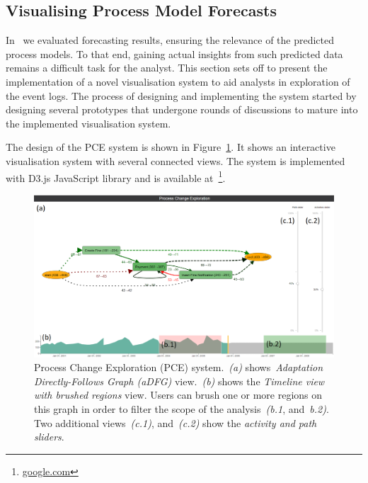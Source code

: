 \subsection{Visualising Process Model Forecasts}\label{sec:visualisation}

In~ we evaluated forecasting results, ensuring the relevance of the predicted process models. To that end, gaining actual insights from such predicted data remains a difficult task for the analyst. This section sets off to present the implementation of a novel visualisation system to aid analysts in exploration of the event logs. The process of designing and implementing the system started by designing several prototypes that undergone rounds of discussions to mature into the implemented visualisation system. 

The design of the PCE system is shown in Figure~\ref{fig:vis-two-brushes}. It shows an interactive visualisation system with several connected views. The system is implemented with D3.js JavaScript library and is available at~\footnote{\url{google.com}}.


\begin{figure}
	\centering
	\includegraphics[width=\textwidth]{img/vis/actual-predicted-two-brushed-regions-system.PNG}
	\caption{Process Change Exploration (PCE) system.~\emph{(a)} shows~\emph{Adaptation Directly-Follows Graph (aDFG)} view.~\emph{(b)} shows the \emph{Timeline view with brushed regions} view. Users can brush one or more regions on this graph in order to filter the scope of the analysis~\emph{(b.1}, and~\emph{b.2)}. Two additional views~\emph{(c.1)}, and~\emph{(c.2)} show the \emph{activity and path sliders}.} 
	\label{fig:vis-two-brushes}
\end{figure}